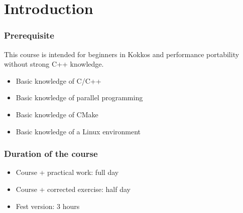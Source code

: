 \documentclass[aspectratio=169]{beamer}
\begin{document}

\section{Introduction}



\begin{frame}
\frametitle{Prerequisite}

This course is intended for beginners in Kokkos and performance portability without strong C++ knowledge. 

\begin{itemize}
    \item Basic knowledge of C/C++
    \item Basic knowledge of parallel programming
    \item Basic knowledge of CMake
    \item Basic knowledge of a Linux environment
\end{itemize}

\end{frame}


\begin{frame}
    \frametitle{Duration of the course}
    
    \begin{itemize}
        \item Course + practical work: full day 
        \item Course + corrected exercise: half day
        \item Fest version: 3 hours
    \end{itemize}
    
 \end{frame}

\end{document}
